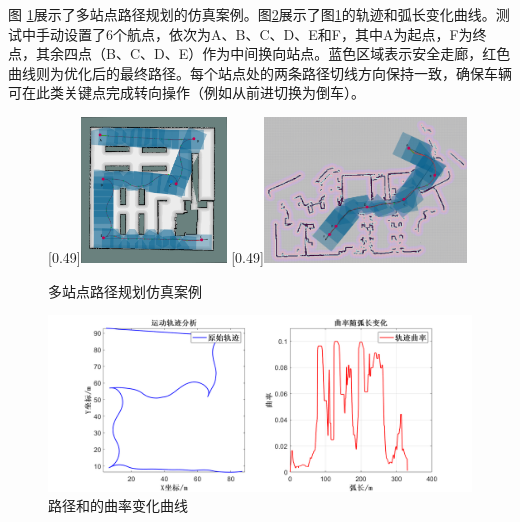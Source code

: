 \documentclass[master,academic]{ysuthesis} %
\begin{document}
		图 \ref{fig:多点路径规划仿真案例}展示了多站点路径规划的仿真案例。图\ref{fig:datamuti}展示了图\ref{fig:多点路径规划仿真案例}的轨迹和弧长变化曲线。测试中手动设置了6个航点，依次为A、B、C、D、E和F，其中A为起点，F为终点，其余四点（B、C、D、E）作为中间换向站点。蓝色区域表示安全走廊，红色曲线则为优化后的最终路径。每个站点处的两条路径切线方向保持一致，确保车辆可在此类关键点完成转向操作（例如从前进切换为倒车）。
		\begin{figure}[H]
			\centering
			[0.49\textwidth]{\includegraphics[width=0.344\textwidth]{muti.png}}
			[0.49\textwidth]{\includegraphics[width=0.48\textwidth]{dataminco.png}}
			\caption{多站点路径规划仿真案例}
			\label{fig:多点路径规划仿真案例}
			\end{figure}

			\begin{figure}[H]
				\centering
				\includegraphics[width=1\textwidth]{datamuti.png}
				\caption{路径和的曲率变化曲线}
				\label{fig:datamuti}
				\end{figure}
		
\end{document}
